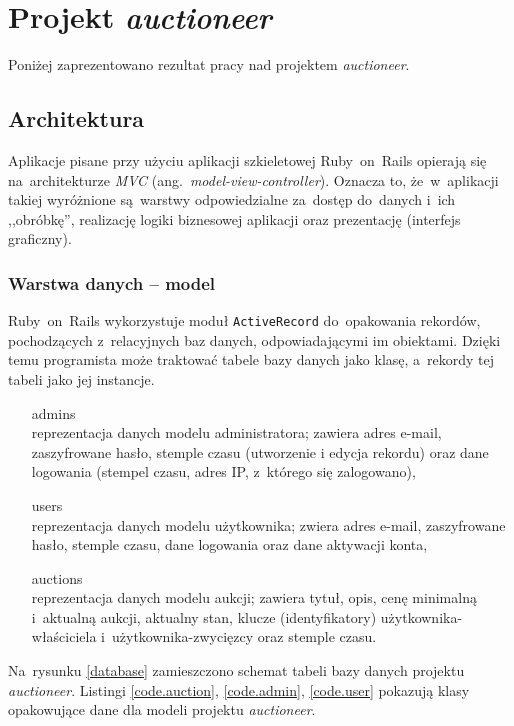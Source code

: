 \section{Projekt \textit{auctioneer}}

Poniżej zaprezentowano rezultat pracy nad projektem \textit{auctioneer}.

\subsection{Architektura}

Aplikacje pisane przy użyciu aplikacji szkieletowej Ruby~on~Rails opierają się na~architekturze \textit{MVC} (ang.~\textit{model-view-controller}). Oznacza to, że~w~aplikacji takiej wyróżnione są~warstwy odpowiedzialne za~dostęp do~danych i~ich ,,obróbkę'', realizację logiki biznesowej aplikacji oraz prezentację (interfejs graficzny).

\subsubsection{Warstwa danych -- model}

Ruby~on~Rails wykorzystuje moduł \texttt{ActiveRecord} do~opakowania rekordów, pochodzących z~relacyjnych baz danych, odpowiadającymi im obiektami. Dzięki temu programista może traktować tabele bazy danych jako klasę, a~rekordy tej tabeli jako jej instancje.

\begin{itemize}
  \item[admins]\hfill\\ reprezentacja danych modelu administratora; zawiera adres e-mail, zaszyfrowane hasło, stemple czasu (utworzenie i edycja rekordu) oraz dane logowania (stempel czasu, adres IP, z~którego się zalogowano),
  \item[users]\hfill\\ reprezentacja danych modelu użytkownika; zwiera adres e-mail, zaszyfrowane hasło, stemple czasu, dane logowania oraz dane aktywacji konta,
  \item[auctions]\hfill\\ reprezentacja danych modelu aukcji; zawiera tytuł, opis, cenę minimalną i~aktualną aukcji, aktualny stan, klucze (identyfikatory) użytkownika-właściciela i~użytkownika-zwycięzcy oraz stemple czasu.
\end{itemize}

Na~rysunku \ref{database} zamieszczono schemat tabeli bazy danych projektu \textit{auctioneer}. Listingi \ref{code.auction}, \ref{code.admin}, \ref{code.user} pokazują klasy opakowujące dane dla modeli projektu \textit{auctioneer}.

